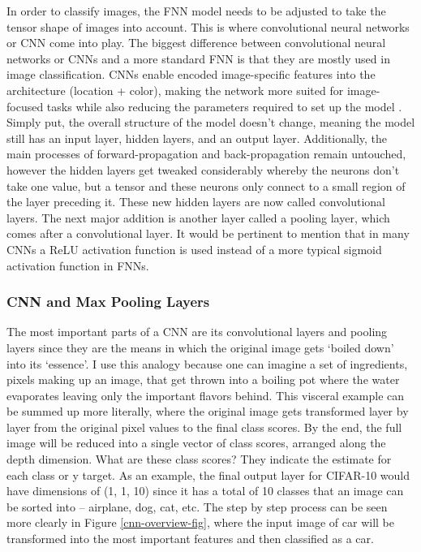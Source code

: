 \documentclass[12pt]{article}
\begin{document}
            
                In order to classify images, the FNN model needs to be adjusted to take the tensor shape of images into account. 
                This is where convolutional neural networks or CNN come into play. 
                The biggest difference between convolutional neural networks 
                or CNNs and a more standard FNN is that they are mostly used in image classification. 
                CNNs enable encoded image-specific features into the architecture (location + color), 
                making the network more suited for image-focused tasks 
                while also reducing the parameters required to set up the model \cite{oshea2015}. 
                Simply put, the overall structure of the model doesn’t change, 
                meaning the model still has an input layer, hidden layers, and an output layer. 
                Additionally, the main processes of forward-propagation and back-propagation remain untouched, 
                however the hidden layers get tweaked considerably whereby the neurons don’t take one value, 
                but a tensor and these neurons only connect to a small region of the layer preceding it. 
                These new hidden layers are now called convolutional layers. 
                The next major addition is another layer called a pooling layer, which comes after a convolutional layer. 
                It would be pertinent to mention that in many CNNs a ReLU activation function is used 
                instead of a more typical sigmoid activation function in FNNs.
            
            \subsubsection{CNN and Max Pooling Layers}


                The most important parts of a CNN are its convolutional layers and pooling layers 
                since they are the means in which the original image gets ‘boiled down’ into its ‘essence’.
                I use this analogy because one can imagine a set of ingredients, pixels making up an image, 
                that get thrown into a boiling pot where the water evaporates leaving only the important flavors behind. 
                This visceral example can be summed up more literally, 
                where the original image gets transformed layer by layer from the original pixel values to the final class scores. 
                By the end, the full image will be reduced into a single vector of class scores, arranged along the depth dimension. 
                What are these class scores? They indicate the estimate for each class or y target. 
                As an example, the final output layer for CIFAR-10 would have dimensions of (1, 1, 10) 
                since it has a total of 10 classes that an image can be sorted into \cite{cs231n2023} -- airplane, dog, cat, etc.
                The step by step process can be seen more clearly in Figure \ref{cnn-overview-fig},
                where the input image of car will be transformed into the most important features and then classified as a car.
\end{document}
